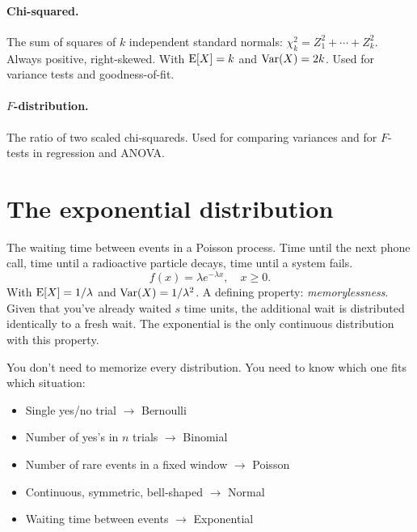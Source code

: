 \paragraph{Chi-squared.} The sum of squares of $k$ independent standard normals: $\chi^2_k = Z_1^2 + \cdots + Z_k^2$. Always positive, right-skewed. With $\operatorname{E}[X] = k$ and $\operatorname{Var}(X) = 2k$. Used for variance tests and goodness-of-fit.

\paragraph{$F$-distribution.} The ratio of two scaled chi-squareds. Used for comparing variances and for $F$-tests in regression and ANOVA.

\section{The exponential distribution}

The waiting time between events in a Poisson process. Time until the next phone call, time until a radioactive particle decays, time until a system fails.
\begin{equation}
  f(x) = \lambda e^{-\lambda x}, \quad x \geq 0.
  \label{eq:exponential-pdf}
\end{equation}
With $\operatorname{E}[X] = 1/\lambda$ and $\operatorname{Var}(X) = 1/\lambda^2$. A defining property: \emph{memorylessness}. Given that you've already waited $s$ time units, the additional wait is distributed identically to a fresh wait. The exponential is the only continuous distribution with this property.

\begin{keyinsight}
You don't need to memorize every distribution. You need to know which one fits which situation:
\begin{itemize}[noitemsep]
\item Single yes/no trial $\to$ Bernoulli
\item Number of yes's in $n$ trials $\to$ Binomial
\item Number of rare events in a fixed window $\to$ Poisson
\item Continuous, symmetric, bell-shaped $\to$ Normal
\item Waiting time between events $\to$ Exponential
\end{itemize}
\end{keyinsight}

